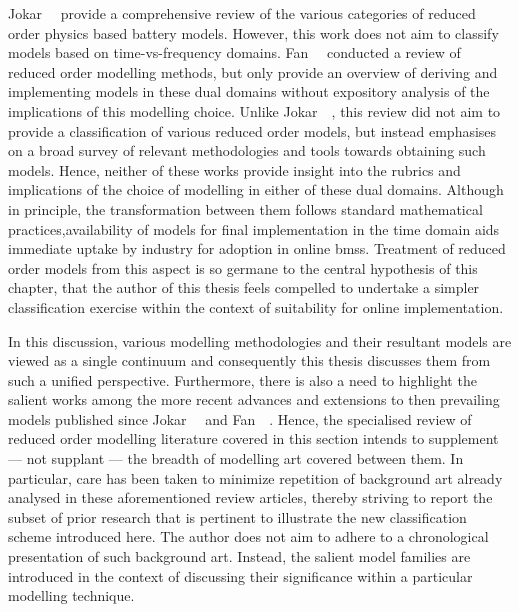 
Jokar~\etal~\cite{Jokar2016}  provide  a  comprehensive review  of  the  various
categories  of  reduced  order  physics  based  battery  models.  However,  this
work  does  not aim  to  classify  models  based on  time-vs-frequency  domains.
Fan~\etal{}~\cite{Fan2015}  conducted  a  review   of  reduced  order  modelling
methods, but  only provide an  overview of  deriving and implementing  models in
these  dual domains  without expository  analysis  of the  implications of  this
modelling choice.  Unlike Jokar~\etal~\cite{Jokar2016}, this review  did not aim
to  provide  a classification  of  various  reduced  order models,  but  instead
emphasises  on  a broad  survey  of  relevant  methodologies and  tools  towards
obtaining such  models. Hence, neither of  these works provide insight  into the
rubrics and  implications of  the choice  of modelling in  either of  these dual
domains. Although in principle, the transformation between them follows standard
mathematical  practices,availability  of models  for
final implementation  in the time domain  aids immediate uptake by  industry for
adoption  in online  \glspl{bms}. Treatment  of reduced  order models  from this
aspect is  so germane to  the central  hypothesis of this  chapter, that  the author  of this  thesis feels
compelled to undertake  a simpler classification exercise within  the context of
suitability for online implementation.


In this discussion,  various modelling methodologies and  their resultant models
are viewed  as a single  continuum and  consequently this thesis  discusses them
from  such  a  unified  perspective.  Furthermore,  there  is  also  a  need  to
highlight  the salient  works  among  the more  recent  advances and  extensions
to  then  prevailing  models published  since  Jokar~\etal~\cite{Jokar2016}  and
Fan~\etal~\cite{Fan2015}.  Hence,  the  specialised   review  of  reduced  order
modelling  literature covered  in this  section  intends to  supplement ---  not
supplant --- the  breadth of modelling art covered between  them. In particular,
care has been taken to minimize repetition of background art already analysed in
these aforementioned review  articles, thereby striving to report  the subset of
prior research  that is  pertinent to illustrate  the new  classification scheme
introduced  here.  The  author  does  not  aim  to  adhere  to  a  chronological
presentation of  such background  art. Instead, the  salient model  families are
introduced in the  context of discussing their significance  within a particular
modelling technique.



